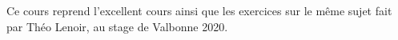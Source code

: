 Ce cours reprend l'excellent cours ainsi que les exercices sur le même sujet fait par Théo Lenoir, au stage de Valbonne 2020.